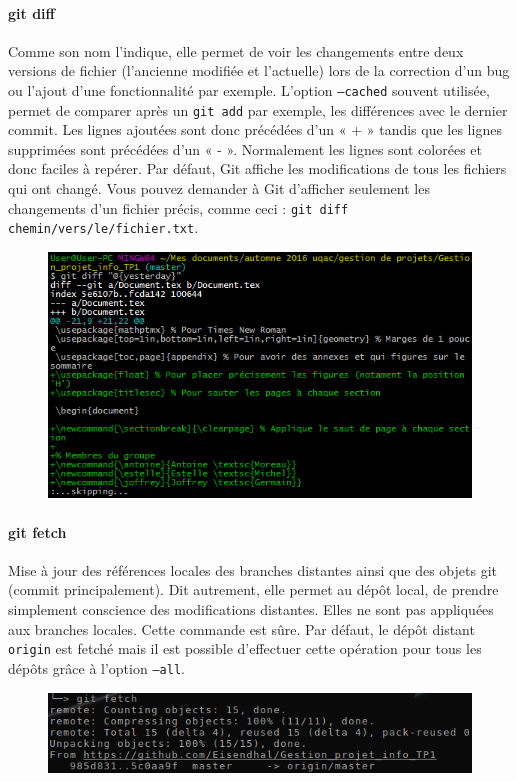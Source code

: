 \documentclass[11pt,canadien]{article}
\begin{document}
\paragraph{git diff}Comme son nom l’indique, elle permet de voir les changements entre deux versions de fichier (l’ancienne modifiée et l’actuelle) lors de la correction d’un bug ou l’ajout d’une fonctionnalité par exemple. L'option \texttt{--cached} souvent utilisée, permet de comparer après un \texttt{git add} par exemple, les différences avec le dernier commit. Les lignes ajoutées sont donc précédées d’un « + » tandis que les lignes supprimées sont précédées d’un « - ». Normalement les lignes sont colorées et donc faciles à repérer. Par défaut, Git affiche les modifications de tous les fichiers qui ont changé. Vous pouvez demander à Git d’afficher seulement les changements d’un fichier précis, comme ceci : \texttt{git diff chemin/vers/le/fichier.txt}.
\begin{figure}[H]
	\centering
	\includegraphics{images/git_diff.png}
\end{figure}

\paragraph{git fetch}Mise à jour des références locales des branches distantes ainsi que des objets git (commit principalement). Dit autrement, elle permet au dépôt local, de prendre simplement conscience des modifications distantes. Elles ne sont pas appliquées aux branches locales. Cette commande est sûre. Par défaut, le dépôt distant \texttt{origin} est fetché mais il est possible d'effectuer cette opération pour tous les dépôts grâce à l'option \texttt{--all}.
\begin{figure}[H]
	\centering
	\includegraphics{images/git_fetch.png}
\end{figure}
\end{document}
